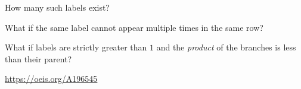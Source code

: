 \documentclass{article}
\begin{document}
\begin{question}
  How many such labels exist?
\end{question}
\begin{related}
  \item What if the same label cannot appear multiple times in the same row?
  \item What if labels are strictly greater than $1$ and the \textit{product} of
    the branches is less than their parent?
\end{related}
\begin{references}
  \item \url{https://oeis.org/A196545}
\end{references}
\end{document}
